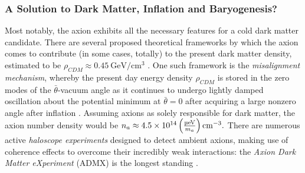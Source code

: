 \subsubsection{A Solution to Dark Matter, Inflation and Baryogenesis?}

Most notably, the axion exhibits all the necessary features for a cold dark matter candidate.
There are several proposed theoretical frameworks by which the axion comes to contribute (in some cases, totally) to the present dark matter density, estimated to be $ρ_{CDM} \approx \SI{0.45}{\giga\eV\per\cubic\cm}$ \cite[§\,5.3]{landscape_2020}.
One such framework is the \emph{misalignment mechanism}, whereby the present day energy density $ρ_{CDM}$ is stored in the zero modes of the $\bar θ$-vacuum angle as it continues to undergo lightly damped oscillation about the potential minimum at $\bar θ = 0$ after acquiring a large nonzero angle after inflation \cite[§\,5.3]{landscape_2020}.
Assuming axions as solely responsible for dark matter, the axion number density would be
\begin{math}
	n_a \approx \num{4.5e14}\,\qty(\frac{\si{\micro\eV}}{m_a})\,\si{\per\cubic\cm}
.\end{math}
There are numerous active \emph{haloscope experiments} designed to detect ambient axions, making use of coherence effects to overcome their incredibly weak interactions: the \emph{Axion Dark Matter eXperiment} (ADMX) \cite{AMDX-2020} is the longest standing \cite[§\,7]{Irastorza_2018}.

